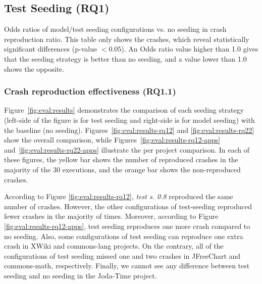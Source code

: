 \subsection{Test Seeding (\textbf{RQ1})}


\begin{table}[t]
    \center
    \caption{Odds ratios of model/test seeding configurations vs. no seeding in crash reproduction ratio. This table only shows the crashes, which reveal statistically significant differences (p-value $< 0.05$). An Odds ratio value higher than 1.0 gives that the seeding strategy is better than no seeding, and a value lower than 1.0 shows the opposite.}
	\label{tab:oddratios}
	\footnotesize
	\subfloat{}
    \subfloat{}
\end{table}

\subsubsection{Crash reproduction effectiveness (\textbf{RQ1.1})}

Figure~\ref{fig:eval:results} demonstrates the comparison of each seeding strategy (left-side of the figure is for test seeding and right-side is for model seeding) with the baseline (no seeding). Figures~\ref{fig:eval:results-rq12} and \ref{fig:eval:results-rq22} show the overall comparison, while Figures~\ref{fig:eval:results-rq12-apps} and~\ref{fig:eval:results-rq22-apps} illustrate the per project comparison. In each of these figures, the yellow bar shows the number of reproduced crashes in the majority of the 30 executions, and the orange bar shows the non-reproduced crashes.

According to Figure \ref{fig:eval:results-rq12}, \textit{test s. 0.8} reproduced the same number of crashes. However, the other configurations of test-seeding reproduced fewer crashes in the majority of times. Moreover, according to Figure \ref{fig:eval:results-rq12-apps}, test seeding reproduces one more crash compared to no seeding. Also, some configurations of test seeding can reproduce one extra crash in  XWiki and commons-lang projects. On the contrary, all of the configurations of test seeding missed one and two crashes in JFreeChart and commons-math, respectively. Finally, we cannot see any difference between test seeding and no seeding in the Joda-Time project.
 
